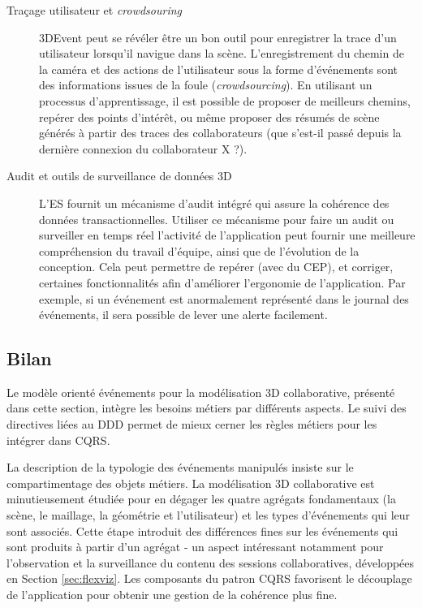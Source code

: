 \begin{description}
	\item[Traçage utilisateur et \textit{crowdsouring}] 3DEvent peut se révéler être 
	un bon outil pour enregistrer la trace d'un utilisateur lorsqu'il navigue dans la 
	scène. L'enregistrement du chemin de la caméra et des actions de l'utilisateur 
	sous la forme d'événements sont des informations 
	\og issues de la foule\fg{} (\textit{crowdsourcing}). En utilisant un processus 
	d'apprentissage, il est possible de proposer de meilleurs chemins, repérer des 
	points d'intérêt, ou même proposer des résumés de scène générés à partir des 
	traces des collaborateurs (que s'est-il passé depuis la dernière connexion du 
	collaborateur X ?).
	\item[Audit et outils de surveillance de données 3D] L'\gls{ES} fournit un 
	mécanisme 
	d'audit intégré qui assure la cohérence des données transactionnelles. Utiliser 
	ce mécanisme pour faire un audit ou surveiller en temps réel l'activité de 
	l'application peut fournir une meilleure compréhension du travail d'équipe, ainsi 
	que de l'évolution de la conception. Cela peut permettre de repérer (avec du 
	\gls{CEP}), et corriger, certaines fonctionnalités afin d'améliorer l'ergonomie de 
	l'application. Par exemple, si un événement est anormalement représenté dans 
	le journal des événements, il sera possible de lever une alerte facilement.
\end{description}
\subsection{Bilan}

Le modèle orienté événements pour la modélisation \gls{3D} collaborative, présenté 
dans 
cette section, intègre les besoins métiers par différents aspects. Le suivi des 
directives liées au \gls{DDD} permet de mieux cerner les règles 
métiers pour les intégrer dans \gls{CQRS}. 

La description de la typologie des 
événements manipulés insiste sur le compartimentage des objets métiers. La 
modélisation \gls{3D} collaborative est minutieusement étudiée pour en dégager 
les quatre 
agrégats fondamentaux (la scène, le maillage, la géométrie et l'utilisateur) et les 
types d'événements qui leur sont associés. Cette étape introduit des différences 
fines sur les événements qui sont produits à partir d'un agrégat - un aspect intéressant notamment pour l'observation et la surveillance du 
contenu des sessions collaboratives, développées en Section 
\ref{sec:flexviz}. 
Les composants du patron \gls{CQRS} favorisent le découplage de l'application 
pour obtenir une gestion de la cohérence plus fine. 

